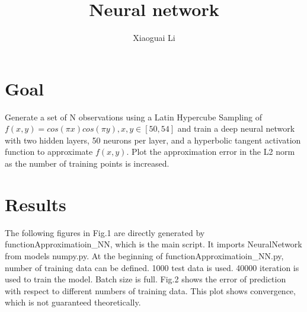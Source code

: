 \documentclass{article}
\title{Neural network}
\author{Xiaoguai Li}
\date{}
\begin{document}
\maketitle

\section{Goal}
Generate a set of N observations using a Latin Hypercube Sampling of $f(x, y) = cos(\pi x) cos(\pi y), x, y \in [50, 54]$ and train a deep neural network with two hidden layers, 50 neurons per layer, and a hyperbolic tangent activation function to approximate $f(x,y)$. Plot the approximation error in the L2 norm as the number of training points is increased.

\section{Results}
The following figures in Fig.1 are directly generated by functionApproximatioin\_NN, which is the main script. It imports NeuralNetwork from models numpy.py. At the beginning of functionApproximatioin\_NN.py, number of training data can be defined.
1000 test data is used. 40000 iteration is used to train the model. Batch size is full. Fig.2
shows the error of prediction with respect to different numbers of training data. This plot shows
convergence, which is not guaranteed theoretically.
\end{document}
